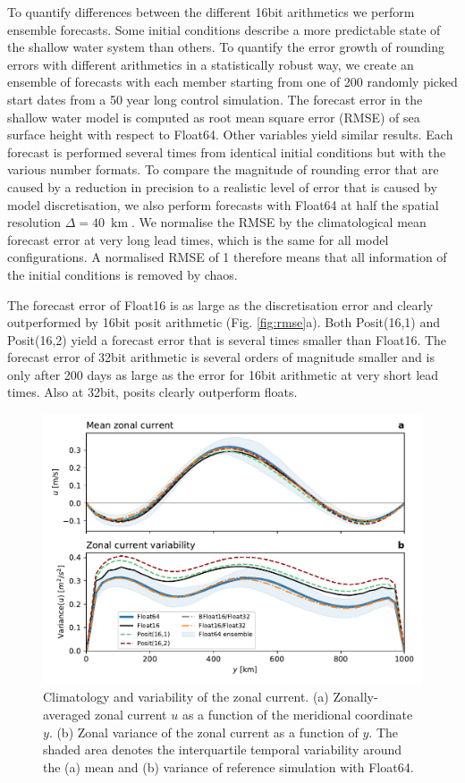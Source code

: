 \documentclass[draft]{agujournal2019}
\newcommand{\op}{\operatorname}
\begin{document}
To quantify differences between the different 16bit arithmetics we perform ensemble forecasts. Some initial conditions describe a more predictable state of the shallow water system than others. To quantify the error growth of rounding errors with different arithmetics in a statistically robust way, we create an ensemble of forecasts with each member starting from one of 200 randomly picked start dates from a 50 year long control simulation. The forecast error in the shallow water model is computed as root mean square error (RMSE) of sea surface height with respect to Float64. Other variables yield similar results. Each forecast is performed several times from identical initial conditions but with the various number formats. To compare the magnitude of rounding error that are caused by a reduction in precision to a realistic level of error that is caused by model discretisation, we also perform forecasts with Float64 at half the spatial resolution $\Delta = 40~\op{km}$. We normalise the RMSE by the climatological mean forecast error at very long lead times, which is the same for all model configurations. A normalised RMSE of 1 therefore means that all information of the initial conditions is removed by chaos.

The forecast error of Float16 is as large as the discretisation error and clearly outperformed by 16bit posit arithmetic (Fig. \ref{fig:rmse}a). Both Posit(16,1) and Posit(16,2) yield a forecast error that is several times smaller than Float16. The forecast error of 32bit arithmetic is several orders of magnitude smaller and is only after 200 days as large as the error for 16bit arithmetic at very short lead times. Also at 32bit, posits clearly outperform floats.

\begin{figure}
\includegraphics[width=1\textwidth]{../plots/meanvar_u.pdf}
\caption{Climatology and variability of the zonal current. (a) Zonally-averaged zonal current $u$ as a function of the meridional coordinate $y$. (b) Zonal variance of the zonal current as a function of $y$. The shaded area denotes the interquartile temporal variability around the (a) mean and (b) variance of reference simulation with Float64.}
\label{fig:mean}
\end{figure}
\end{document}
